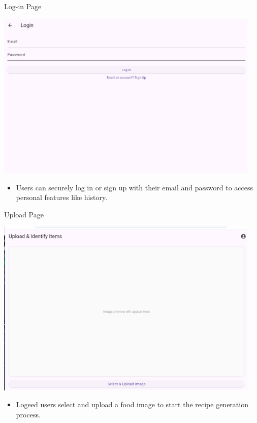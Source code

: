 \documentclass{beamer}
\begin{document}
\begin{frame}{Log-in Page}
    \begin{center}
        \includegraphics[width=0.95\textwidth,height=0.58\textheight,keepaspectratio]{login_page.png}
    \end{center}
    \vspace{2mm}
    \begin{itemize}
        \item \small Users can securely log in or sign up with their email and password to access personal features like history.
    \end{itemize}
\end{frame}

\begin{frame}{Upload Page}
    \begin{center}
        \includegraphics[width=0.95\textwidth,height=0.58\textheight,keepaspectratio]{upload_page.png}
    \end{center}
    \vspace{2mm}
    \begin{itemize}
        \item \small Logeed users select and upload a food image to start the recipe generation process.
    \end{itemize}
\end{frame}
\end{document}
